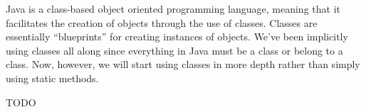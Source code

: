 

Java is a class-based object oriented programming language, meaning
that it facilitates the creation of objects through the use of classes.
Classes are essentially ``blueprints'' for creating instances of 
objects.  We've been implicitly using classes all along since everything
in Java must be a class or belong to a class.  Now, however, we will
start using classes in more depth rather than simply using static 
methods.

TODO


